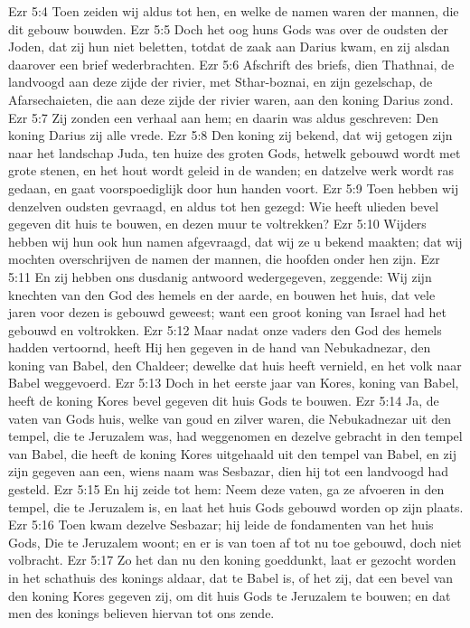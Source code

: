 Ezr 5:4  Toen zeiden wij aldus tot hen, en welke de namen waren der mannen, die dit gebouw bouwden.
Ezr 5:5  Doch het oog huns Gods was over de oudsten der Joden, dat zij hun niet beletten, totdat de zaak aan Darius kwam, en zij alsdan daarover een brief wederbrachten.
Ezr 5:6  Afschrift des briefs, dien Thathnai, de landvoogd aan deze zijde der rivier, met Sthar-boznai, en zijn gezelschap, de Afarsechaieten, die aan deze zijde der rivier waren, aan den koning Darius zond.
Ezr 5:7  Zij zonden een verhaal aan hem; en daarin was aldus geschreven: Den koning Darius zij alle vrede.
Ezr 5:8  Den koning zij bekend, dat wij getogen zijn naar het landschap Juda, ten huize des groten Gods, hetwelk gebouwd wordt met grote stenen, en het hout wordt geleid in de wanden; en datzelve werk wordt ras gedaan, en gaat voorspoediglijk door hun handen voort.
Ezr 5:9  Toen hebben wij denzelven oudsten gevraagd, en aldus tot hen gezegd: Wie heeft ulieden bevel gegeven dit huis te bouwen, en dezen muur te voltrekken?
Ezr 5:10  Wijders hebben wij hun ook hun namen afgevraagd, dat wij ze u bekend maakten; dat wij mochten overschrijven de namen der mannen, die hoofden onder hen zijn.
Ezr 5:11  En zij hebben ons dusdanig antwoord wedergegeven, zeggende: Wij zijn knechten van den God des hemels en der aarde, en bouwen het huis, dat vele jaren voor dezen is gebouwd geweest; want een groot koning van Israel had het gebouwd en voltrokken.
Ezr 5:12  Maar nadat onze vaders den God des hemels hadden vertoornd, heeft Hij hen gegeven in de hand van Nebukadnezar, den koning van Babel, den Chaldeer; dewelke dat huis heeft vernield, en het volk naar Babel weggevoerd.
Ezr 5:13  Doch in het eerste jaar van Kores, koning van Babel, heeft de koning Kores bevel gegeven dit huis Gods te bouwen.
Ezr 5:14  Ja, de vaten van Gods huis, welke van goud en zilver waren, die Nebukadnezar uit den tempel, die te Jeruzalem was, had weggenomen en dezelve gebracht in den tempel van Babel, die heeft de koning Kores uitgehaald uit den tempel van Babel, en zij zijn gegeven aan een, wiens naam was Sesbazar, dien hij tot een landvoogd had gesteld.
Ezr 5:15  En hij zeide tot hem: Neem deze vaten, ga ze afvoeren in den tempel, die te Jeruzalem is, en laat het huis Gods gebouwd worden op zijn plaats.
Ezr 5:16  Toen kwam dezelve Sesbazar; hij leide de fondamenten van het huis Gods, Die te Jeruzalem woont; en er is van toen af tot nu toe gebouwd, doch niet volbracht.
Ezr 5:17  Zo het dan nu den koning goeddunkt, laat er gezocht worden in het schathuis des konings aldaar, dat te Babel is, of het zij, dat een bevel van den koning Kores gegeven zij, om dit huis Gods te Jeruzalem te bouwen; en dat men des konings believen hiervan tot ons zende.
